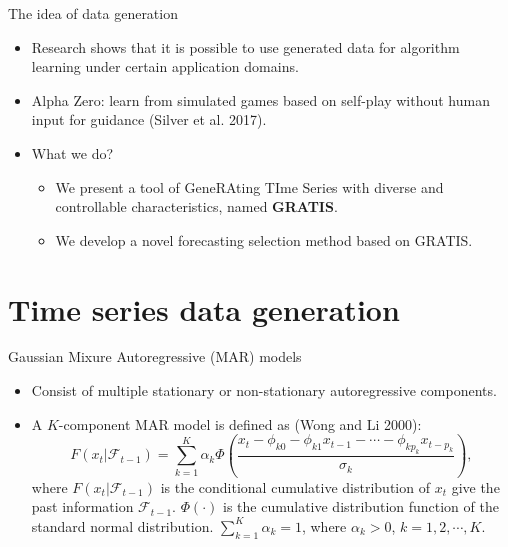 \documentclass[12pt,ignorenonframetext,compress]{beamer}
\providecommand{\tightlist}{%
  \setlength{\itemsep}{0pt}\setlength{\parskip}{0pt}}
\begin{document}
\begin{frame}{The idea of data generation}
\begin{itemize}
\item 
Research shows that it is possible to use generated data for algorithm learning under certain application domains.
\item 
Alpha Zero: learn from simulated games based on self-play without human input for guidance (Silver et al. 2017).
\item 
What we do?
\begin{itemize}
\item We present a tool of GeneRAting TIme Series with diverse and controllable characteristics, named \textbf{GRATIS}. 
\item We develop a novel forecasting selection method based on GRATIS.

\end{itemize}
\end{itemize}
\end{frame}

\hypertarget{training-data-simulation}{%
\section{Time series data generation}\label{training-data-simulation}}

\begin{frame}{Gaussian Mixure Autoregressive (MAR) models}
\protect\hypertarget{gaussian-mixure-autoregressive-mar-models}{}

\begin{itemize}
\tightlist
\item
  Consist of multiple stationary or non-stationary autoregressive
  components.\\
\item
  A \(K\)-component MAR model is defined as (Wong and Li 2000): \[
  F(x_t|\mathcal{F}_{t-1}) =
  \sum\limits_{k=1}^K\alpha_k\Phi(\frac{x_t-\phi_{k0}-\phi_{k1}x_{t-1}-\cdots
  -\phi_{kp_k}x_{t-p_k}}{\sigma_k}),
  \] where \(F(x_t|\mathcal{F}_{t-1})\) is the conditional cumulative
  distribution of \(x_t\) give the past information
  \(\mathcal{F}_{t-1}\). \(\Phi(\cdot)\) is the cumulative distribution
  function of the standard normal distribution.
  \(\sum_{k=1}^K \alpha_k= 1\), where \(\alpha_k > 0\),
  \(k = 1, 2, \cdots, K\).
\end{itemize}

\end{frame}
\end{document}
